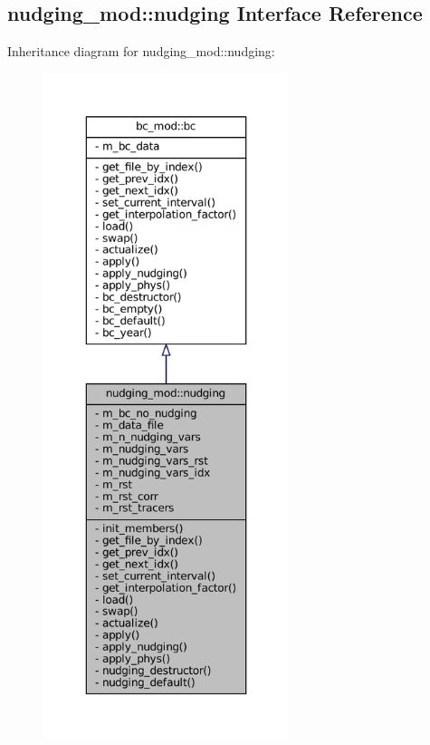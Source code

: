 \hypertarget{structnudging__mod_1_1nudging}{}\subsection{nudging\+\_\+mod\+:\+:nudging Interface Reference}
\label{structnudging__mod_1_1nudging}


Inheritance diagram for nudging\+\_\+mod\+:\+:nudging\+:
\nopagebreak
\begin{figure}[H]
\begin{center}
\leavevmode
\includegraphics[height=550pt]{structnudging__mod_1_1nudging__inherit__graph}
\end{center}
\end{figure}
